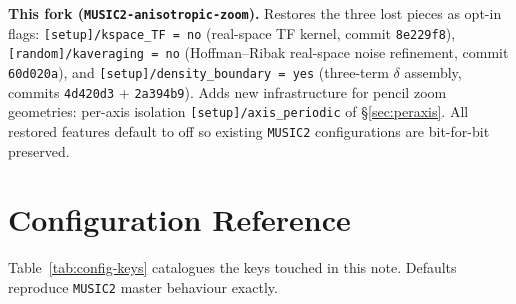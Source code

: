 \documentclass[12pt]{article}
\newcommand{\code}[1]{\texttt{#1}}
\begin{document}
\textbf{This fork (\texttt{MUSIC2-anisotropic-zoom}).}  Restores the
three lost pieces as opt-in flags:
\code{[setup]/kspace\_TF = no} (real-space TF kernel, commit
\texttt{8e229f8}), \code{[random]/kaveraging = no}
(Hoffman--Ribak real-space noise refinement, commit
\texttt{60d020a}), and \code{[setup]/density\_boundary = yes}
(three-term $\delta$ assembly, commits \texttt{4d420d3} +
\texttt{2a394b9}).  Adds new infrastructure for pencil zoom
geometries: per-axis isolation \code{[setup]/axis\_periodic} of
\S\ref{sec:peraxis}.  All restored features default to off so
existing \texttt{MUSIC2} configurations are bit-for-bit preserved.

\section{Configuration Reference}
\label{sec:config}

Table~\ref{tab:config-keys} catalogues the keys touched in this
note.  Defaults reproduce \texttt{MUSIC2} master behaviour exactly.
\end{document}
